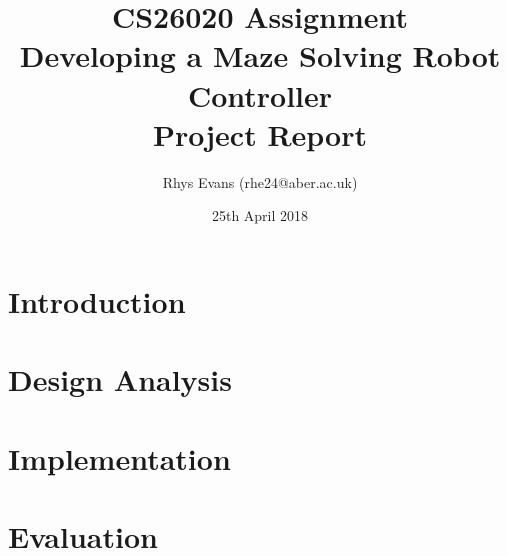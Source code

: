 \documentclass[a4paper]{article}
\begin{document}
	\title{CS26020 Assignment \\ Developing a Maze Solving Robot Controller \\ Project Report}
	\author{Rhys Evans (rhe24@aber.ac.uk)}
	\date{25th April 2018}
	\maketitle
	\newpage
	\tableofcontents
	\newpage
	
	\section{Introduction}
	
	\section{Design Analysis}
	
	\section{Implementation}
	
	\section{Evaluation}
	
	
\end{document}
